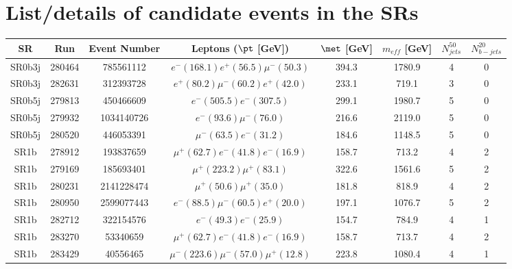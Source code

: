 \clearpage

\section{List/details of candidate events in the SRs}
\label{app:candidates}

\begin{footnotesize}
\begin{tabular}{|c|cc|c|cc|cc|} \hline
SR & Run & Event Number & Leptons ($\pt$ [GeV]) & $\met$ [GeV] & $m_{eff}$ [GeV] & $N_{jets}^{50}$ & $N_{b-jets}^{20}$ \\ \hline
SR0b3j & 280464  &  785561112 & $e^-(168.1) e^+(56.5) \mu^-(50.3)$ & 394.3 & 1780.9 & 4 & 0 \\ 
SR0b3j & 282631  &  312393728 & $e^+(80.2) \mu^-(60.2) e^+(42.0)$ & 233.1 & 719.1 & 3 & 0 \\ 
\hline
SR0b5j & 279813 & 450466609 & $e^-(505.5) e^-(307.5)$ & 299.1 & 1980.7 & 5 & 0 \\
SR0b5j & 279932 & 1034140726 & $e^-(93.6) \mu^-(76.0)$ & 216.6 & 2119.0 & 5 & 0 \\
SR0b5j & 280520 & 446053391 & $\mu^-(63.5) e^-(31.2)$ & 184.6 & 1148.5 & 5 & 0 \\ 
\hline
SR1b & 278912 & 193837659 & $\mu^+(62.7) e^-(41.8) e^-(16.9)$ & 158.7 & 713.2 & 4 & 2 \\
SR1b & 279169 & 185693401 & $\mu^+(223.2) \mu^+(83.1)$ & 322.6 & 1561.6 & 5 & 2 \\
SR1b & 280231 & 2141228474 & $\mu^+(50.6) \mu^+(35.0)$ & 181.8 & 818.9 & 4 & 2 \\
SR1b & 280950 &  2599077443 & $e^-(88.5) \mu^-(60.5) e^+(20.0)$ & 197.1 & 1076.7 & 5 & 2 \\ 
SR1b & 282712 & 322154576  & $e^-(49.3)e^-(25.9)$ & 154.7 & 784.9 & 4 & 1 \\ 
SR1b & 283270 &  53340659 & $\mu^+(62.7)e^-(41.8)e^-(16.9)$ & 158.7 & 713.7 & 4 & 2 \\ 
SR1b & 283429 &  40556465 & $\mu^-(223.6)\mu^-(57.0)\mu^+(12.8)$ & 223.8 & 1080.4 & 4 & 1 \\ 
\hline
\end{tabular}\\

\end{footnotesize}

